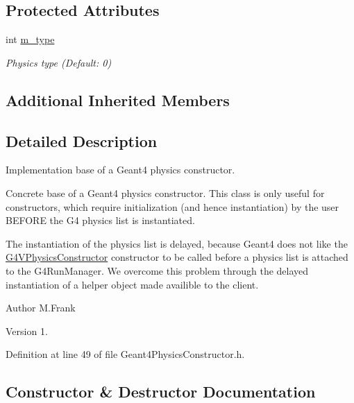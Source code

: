 \subsection*{Protected Attributes}
\begin{DoxyCompactItemize}
\item 
int \hyperlink{class_d_d4hep_1_1_simulation_1_1_geant4_physics_constructor_ac262f2205619b69465908a66dc16b296}{m\+\_\+type}
\begin{DoxyCompactList}\small\item\em Physics type (Default\+: 0) \end{DoxyCompactList}\end{DoxyCompactItemize}
\subsection*{Additional Inherited Members}


\subsection{Detailed Description}
Implementation base of a Geant4 physics constructor. 

Concrete base of a Geant4 physics constructor. This class is only useful for constructors, which require initialization (and hence instantiation) by the user B\+E\+F\+O\+RE the G4 physics list is instantiated.

The instantiation of the physics list is delayed, because Geant4 does not like the \hyperlink{class_g4_v_physics_constructor}{G4\+V\+Physics\+Constructor} constructor to be called before a physics list is attached to the G4\+Run\+Manager. We overcome this problem through the delayed instantiation of a helper object made availible to the client.

\begin{DoxyAuthor}{Author}
M.\+Frank 
\end{DoxyAuthor}
\begin{DoxyVersion}{Version}
1. 
\end{DoxyVersion}


Definition at line 49 of file Geant4\+Physics\+Constructor.\+h.



\subsection{Constructor \& Destructor Documentation}
\hypertarget{class_d_d4hep_1_1_simulation_1_1_geant4_physics_constructor_a64ea9fcabe64e3fe28ed25cf2e707e55}{}\label{class_d_d4hep_1_1_simulation_1_1_geant4_physics_constructor_a64ea9fcabe64e3fe28ed25cf2e707e55} 
